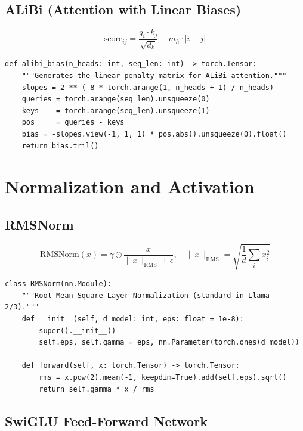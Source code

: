 \subsection{ALiBi (Attention with Linear Biases)}
\label{form:alibi}

\[
  \mathrm{score}_{ij} = \frac{q_i \cdot k_j}{\sqrt{d_k}} - m_h \cdot |i - j|
\]

\begin{lstlisting}[style=pythonstyle, caption={ALiBi bias matrix}, label=lst:alibi]
def alibi_bias(n_heads: int, seq_len: int) -> torch.Tensor:
    """Generates the linear penalty matrix for ALiBi attention."""
    slopes = 2 ** (-8 * torch.arange(1, n_heads + 1) / n_heads)
    queries = torch.arange(seq_len).unsqueeze(0)
    keys    = torch.arange(seq_len).unsqueeze(1)
    pos     = queries - keys
    bias = -slopes.view(-1, 1, 1) * pos.abs().unsqueeze(0).float()
    return bias.tril()
\end{lstlisting}

\section{Normalization and Activation}
\label{app:norm}

\subsection{RMSNorm}
\label{form:rmsnorm}

\[
  \mathrm{RMSNorm}(x) = \gamma \odot \frac{x}{\|x\|_\mathrm{RMS} + \epsilon}, \quad \|x\|_\mathrm{RMS} = \sqrt{\frac{1}{d}\sum_ix_i^2}
\]

\begin{lstlisting}[style=pythonstyle, caption={RMSNorm}, label=lst:rmsnorm]
class RMSNorm(nn.Module):
    """Root Mean Square Layer Normalization (standard in Llama 2/3)."""
    def __init__(self, d_model: int, eps: float = 1e-8):
        super().__init__()
        self.eps, self.gamma = eps, nn.Parameter(torch.ones(d_model))

    def forward(self, x: torch.Tensor) -> torch.Tensor:
        rms = x.pow(2).mean(-1, keepdim=True).add(self.eps).sqrt()
        return self.gamma * x / rms
\end{lstlisting}

\subsection{SwiGLU Feed-Forward Network}
\label{form:swiglu}


